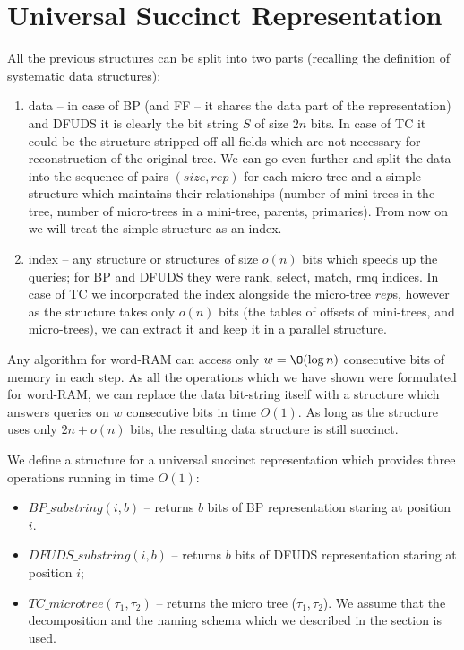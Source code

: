 \section{Universal Succinct Representation}

All the previous structures can be split into two parts (recalling the definition of systematic data structures):
\begin{enumerate}
	\item data -- in case of BP (and FF -- it shares the data part of the representation) and DFUDS it is clearly the bit string $S$ of size $2n$ bits.
	In case of TC it could be the structure stripped off all fields which are not necessary for reconstruction of the original tree.
	We can go even further and split the data into the sequence of pairs $(size, rep)$ for each micro-tree and a simple structure which maintains their relationships (number of mini-trees in the tree, number of micro-trees in a mini-tree, parents, primaries).
	From now on we will treat the simple structure as an index.
	\item index -- any structure or structures of size $o(n)$ bits which speeds up the queries; for BP and DFUDS they were rank, select, match, rmq indices.
	In case of TC we incorporated the index alongside the micro-tree $rep$s, however as the structure takes only $o(n)$ bits (the tables of offsets of mini-trees, and micro-trees), we can extract it and keep it in a parallel structure.
\end{enumerate}

Any algorithm for word-RAM can access only $w = \O(\log n)$ consecutive bits of memory in each step.
As all the operations which we have shown were formulated for word-RAM, we can replace the data bit-string itself with a structure which answers queries on $w$ consecutive bits in time $O(1)$.
As long as the structure uses only $2n + o(n)$ bits, the resulting data structure is still succinct.

We define a structure for a universal succinct representation which provides three operations running in time $O(1)$:
\begin{itemize}
	\item $BP\_substring(i, b)$ -- returns $b$ bits of BP representation staring at position $i$.
	\item $DFUDS\_substring(i, b)$ -- returns $b$ bits of DFUDS representation staring at position $i$;
	\item $TC\_microtree(\tau_1, \tau_2)$ -- returns the micro tree ($\tau_1, \tau_2$).
	We assume that the decomposition and the naming schema which we described in the section  is used.
\end{itemize}


